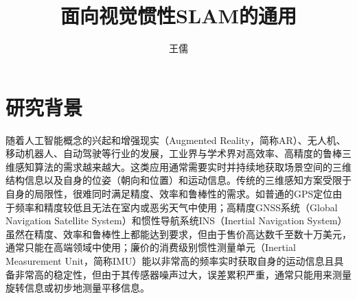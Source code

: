 \documentclass[oneside]{ZJUthesis}
\begin{document}
\songti


\classification{ }

\serialnumber{ }



\title{面向视觉惯性SLAM的通用}


\author{王儒}






\makeProposalCoverPage

\ZJUfrontmatter

\ZJUcontents

\ZJUmainmatter

\chapter{研究背景}

随着人工智能概念的兴起和增强现实（Augmented Reality，简称AR）、无人机、移动机器人、自动驾驶等行业的发展，工业界与学术界对高效率、高精度的鲁棒三维感知算法的需求越来越大。这类应用通常需要实时并持续地获取场景空间的三维结构信息以及自身的位姿（朝向和位置）和运动信息。传统的三维感知方案受限于自身的局限性，很难同时满足精度、效率和鲁棒性的需求。如普通的GPS定位由于频率和精度较低且无法在室内或恶劣天气中使用；高精度GNSS系统（Global Navigation Satellite System）和惯性导航系统INS（Inertial Navigation System）虽然在精度、效率和鲁棒性上都能达到要求，但由于售价高达数千至数十万美元，通常只能在高端领域中使用；廉价的消费级别惯性测量单元（Inertial Measurement Unit，简称IMU）能以非常高的频率实时获取自身的运动信息且具备非常高的稳定性，但由于其传感器噪声过大，误差累积严重，通常只能用来测量旋转信息或初步地测量平移信息。
\end{document}
